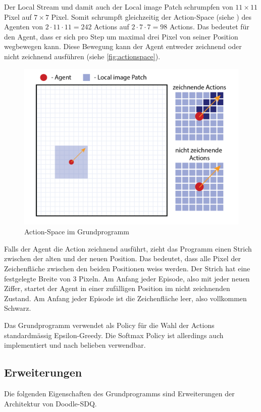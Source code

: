 Der Local Stream und damit auch der Local image Patch schrumpfen von $11\times11$
Pixel auf $7\times7$ Pixel. Somit schrumpft gleichzeitig der Action-Space (siehe
) des Agenten von $2\cdot11\cdot11 = 242$ Actions auf
$2\cdot7\cdot7 = 98$ Actions. Das bedeutet für den Agent, dass er sich pro Step
um maximal drei Pixel von seiner Position wegbewegen kann. Diese Bewegung kann
der Agent entweder zeichnend oder nicht zeichnend ausführen (siehe
\autoref{fig:actionspace}).
 
\begin{figure}[!ht]
 \centering
 \includegraphics[width=\textwidth]{images/methode/actionspace.png}
 \caption{Action-Space im Grundprogramm}\label{fig:actionspace}
\end{figure}
 
Falls der Agent die Action zeichnend ausführt, zieht das Programm einen Strich
zwischen der alten und der neuen Position. Das bedeutet, dass alle Pixel
der Zeichenfläche zwischen den beiden Positionen weiss werden. Der Strich hat eine
festgelegte Breite von $3$ Pixeln. Am Anfang jeder Episode, also mit jeder neuen
Ziffer, startet der Agent in einer zufälligen Position im nicht zeichnenden
Zustand. Am Anfang jeder Episode ist die Zeichenfläche leer, also vollkommen
Schwarz.

Das Grundprogramm verwendet als Policy für die Wahl der Actions standardmässig
Epsilon-Greedy. Die Softmax Policy ist allerdings auch implementiert und nach
belieben verwendbar.


\subsection{Erweiterungen}\label{sub:m_grund_erweiterungen} Die folgenden
Eigenschaften des Grundprogramms sind Erweiterungen der Architektur von
Doodle-SDQ.


